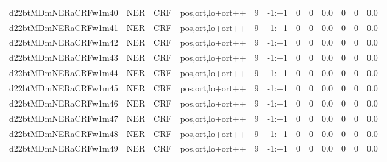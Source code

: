 \documentclass[a4paper]{article}
\begin{document}
\begin{landscape}
\begin{center}
\begin{tabular}{ |c|c|c|c|c|c|c|c|c|c|c|c|}
 
 	
 	\small{ d22btMDmNERaCRFw1m40 } & \small{ NER} & \small{  CRF }  & pos,ort,lo+ort++  &  9 &  \small{  -1:+1 }  &  0 & 0 & 0.0  &  0 & 0 & 0.0 \\
 	

 
 	
 	\small{ d22btMDmNERaCRFw1m41 } & \small{ NER} & \small{  CRF }  & pos,ort,lo+ort++  &  9 &  \small{  -1:+1 }  &  0 & 0 & 0.0  &  0 & 0 & 0.0 \\
 	

 
 	
 	\small{ d22btMDmNERaCRFw1m42 } & \small{ NER} & \small{  CRF }  & pos,ort,lo+ort++  &  9 &  \small{  -1:+1 }  &  0 & 0 & 0.0  &  0 & 0 & 0.0 \\
 	

 
 	
 	\small{ d22btMDmNERaCRFw1m43 } & \small{ NER} & \small{  CRF }  & pos,ort,lo+ort++  &  9 &  \small{  -1:+1 }  &  0 & 0 & 0.0  &  0 & 0 & 0.0 \\
 	

 
 	
 	\small{ d22btMDmNERaCRFw1m44 } & \small{ NER} & \small{  CRF }  & pos,ort,lo+ort++  &  9 &  \small{  -1:+1 }  &  0 & 0 & 0.0  &  0 & 0 & 0.0 \\
 	

 
 	
 	\small{ d22btMDmNERaCRFw1m45 } & \small{ NER} & \small{  CRF }  & pos,ort,lo+ort++  &  9 &  \small{  -1:+1 }  &  0 & 0 & 0.0  &  0 & 0 & 0.0 \\
 	

 
 	
 	\small{ d22btMDmNERaCRFw1m46 } & \small{ NER} & \small{  CRF }  & pos,ort,lo+ort++  &  9 &  \small{  -1:+1 }  &  0 & 0 & 0.0  &  0 & 0 & 0.0 \\
 	

 
 	
 	\small{ d22btMDmNERaCRFw1m47 } & \small{ NER} & \small{  CRF }  & pos,ort,lo+ort++  &  9 &  \small{  -1:+1 }  &  0 & 0 & 0.0  &  0 & 0 & 0.0 \\
 	

 
 	
 	\small{ d22btMDmNERaCRFw1m48 } & \small{ NER} & \small{  CRF }  & pos,ort,lo+ort++  &  9 &  \small{  -1:+1 }  &  0 & 0 & 0.0  &  0 & 0 & 0.0 \\
 	

 
 	
 	\small{ d22btMDmNERaCRFw1m49 } & \small{ NER} & \small{  CRF }  & pos,ort,lo+ort++  &  9 &  \small{  -1:+1 }  &  0 & 0 & 0.0  &  0 & 0 & 0.0 \\
 	


\end{tabular}
\end{center}
\end{landscape}
\end{document}
